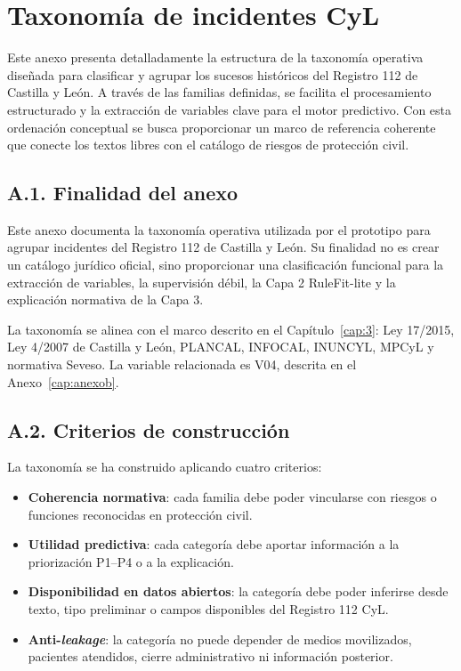 \chapter{Taxonomía de incidentes CyL}
\label{cap:anexoa}

Este anexo presenta detalladamente la estructura de la taxonomía operativa diseñada para clasificar y agrupar los sucesos históricos del Registro 112 de Castilla y León. A través de las familias definidas, se facilita el procesamiento estructurado y la extracción de variables clave para el motor predictivo. Con esta ordenación conceptual se busca proporcionar un marco de referencia coherente que conecte los textos libres con el catálogo de riesgos de protección civil.

\section*{A.1. Finalidad del anexo}

Este anexo documenta la taxonomía operativa utilizada por el prototipo para agrupar
incidentes del Registro 112 de Castilla y León. Su finalidad no es crear un catálogo
jurídico oficial, sino proporcionar una clasificación funcional para la extracción de
variables, la supervisión débil, la Capa 2 RuleFit-lite y la explicación normativa de
la Capa 3.

La taxonomía se alinea con el marco descrito en el Capítulo~\ref{cap:3}: Ley 17/2015,
Ley 4/2007 de Castilla y León, PLANCAL, INFOCAL, INUNCYL, MPCyL y normativa Seveso. La
variable relacionada es V04, descrita en el Anexo~\ref{cap:anexob}.

\section*{A.2. Criterios de construcción}

La taxonomía se ha construido aplicando cuatro criterios:

\begin{itemize}
    \item \textbf{Coherencia normativa}: cada familia debe poder vincularse con riesgos
    o funciones reconocidas en protección civil.
    \item \textbf{Utilidad predictiva}: cada categoría debe aportar información a la
    priorización P1--P4 o a la explicación.
    \item \textbf{Disponibilidad en datos abiertos}: la categoría debe poder inferirse
    desde texto, tipo preliminar o campos disponibles del Registro 112 CyL.
    \item \textbf{Anti-\textit{leakage}}: la categoría no puede depender de medios
    movilizados, pacientes atendidos, cierre administrativo ni información posterior.
\end{itemize}

